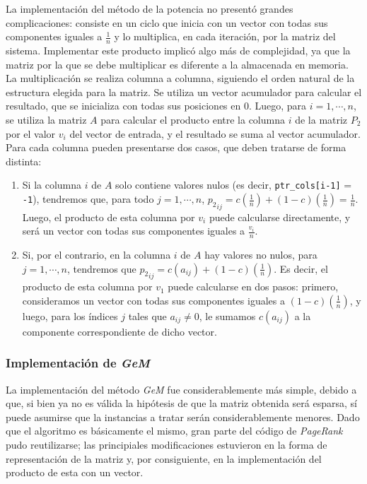         La implementación del método de la potencia no presentó grandes complicaciones: consiste en un ciclo que inicia con un vector con todas sus componentes iguales a $\frac{1}{n}$ y lo multiplica, en cada iteración, por la matriz del sistema. Implementar este producto implicó algo más de complejidad, ya que la matriz por la que se debe multiplicar es diferente a la almacenada en memoria. La multiplicación se realiza columna a columna, siguiendo el orden natural de la estructura elegida para la matriz. Se utiliza un vector acumulador para calcular el resultado, que se inicializa con todas sus posiciones en $0$. Luego, para $i = 1, \cdots, n$, se utiliza la matriz $A$ para calcular el producto entre la columna $i$ de la matriz $P_2$ por el valor $v_i$ del vector de entrada, y el resultado se suma al vector acumulador. Para cada columna pueden presentarse dos casos, que deben tratarse de forma distinta:

        \begin{enumerate}
            \item Si la columna $i$ de $A$ solo contiene valores nulos (es decir, \texttt{ptr\_cols[i-1]} = \texttt{-1}), tendremos que, para todo $j = 1, \cdots, n$, ${p_2}_{ij} = c (\frac{1}{n}) + (1-c) (\frac{1}{n}) = \frac{1}{n}$. Luego, el producto de esta columna por $v_i$ puede calcularse directamente, y será un vector con todas sus componentes iguales a $\frac{v_i}{n}$.
            \item Si, por el contrario, en la columna $i$ de $A$ hay valores no nulos, para $j = 1, \cdots, n$, tendremos que ${p_2}_{ij} = c (a_{ij}) + (1-c) (\frac{1}{n})$. Es decir, el producto de esta columna por $v_1$ puede calcularse en dos pasos: primero, consideramos un vector con todas sus componentes iguales a $(1-c) (\frac{1}{n})$, y luego, para los índices $j$ tales que $a_{ij} \neq 0$, le sumamos $c (a_{ij})$ a la componente correspondiente de dicho vector.
        \end{enumerate}

        \subsubsection{Implementación de \emph{GeM}}

        La implementación del método \emph{GeM} fue considerablemente más simple, debido a que, si bien ya no es válida la hipótesis de que la matriz obtenida será esparsa, sí puede asumirse que la instancias a tratar serán considerablemente menores. Dado que el algoritmo es básicamente el mismo, gran parte del código de \emph{PageRank} pudo reutilizarse; las principiales modificaciones estuvieron en la forma de representación de la matriz y, por consiguiente, en la implementación del producto de esta con un vector.

